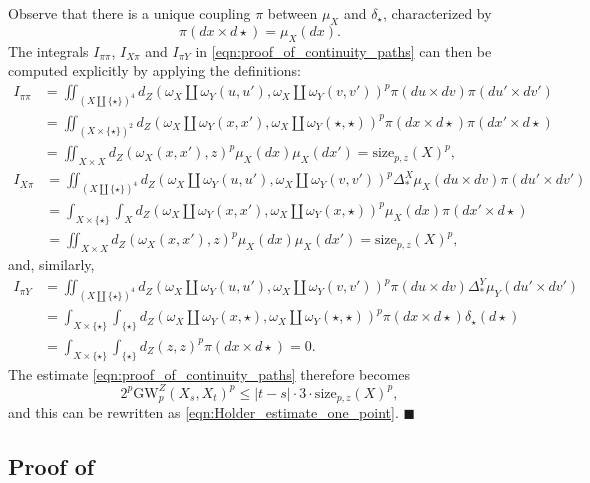\documentclass[twoside,11pt]{article}
\theoremstyle{definition}
\newcommand{\dgwz}{\mathrm{GW}_p^Z}
\begin{document}
    Observe that there is a unique coupling $\pi$ between $\mu_X$ and $\delta_\star$, characterized by
    \[
    \pi(dx \times d\star) = \mu_X(dx).
    \]
    The integrals $I_{\pi \pi}$, $I_{X\pi}$ and $I_{\pi Y}$ in \eqref{eqn:proof_of_continuity_paths} can then be computed explicitly by applying the definitions:
    \begin{align}
        I_{\pi \pi} &= \iint_{(X \amalg \{\star\})^4} d_Z(\omega_X \amalg \omega_Y(u,u'), \omega_X \amalg \omega_Y(v,v'))^p \pi(du \times dv) \pi(du' \times dv') \\
        &= \iint_{(X \times \{\star\})^2} d_Z(\omega_X \amalg \omega_Y(x,x'), \omega_X \amalg \omega_Y(\star,\star))^p \pi(dx \times d\star) \pi(dx' \times d\star) \\
        &= \iint_{X \times X} d_Z(\omega_X(x,x'),z)^p \mu_X(dx)\mu_X(dx') = \mathrm{size}_{p,z}(X)^p,
    \end{align}
    \begin{align}
        I_{X\pi} &= \iint_{(X \amalg \{\star\})^4} d_Z(\omega_X \amalg \omega_Y(u,u'), \omega_X \amalg \omega_Y(v,v'))^p \Delta^X_\ast \mu_X(du \times dv) \pi(du' \times dv') \\
        &= \int_{X \times \{\star\}} \int_X d_Z(\omega_X \amalg \omega_Y(x,x'), \omega_X \amalg \omega_Y(x,\star))^p \mu_X(dx) \pi(dx' \times d\star) \\
        &= \iint_{X \times X} d_Z(\omega_X(x,x'), z)^p \mu_X(dx) \mu_X(dx') = \mathrm{size}_{p,z}(X)^p,
    \end{align}
    and, similarly,
    \begin{align}
       I_{\pi Y} &=  \iint_{(X \amalg \{\star\})^4} d_Z(\omega_X \amalg \omega_Y(u,u'), \omega_X \amalg \omega_Y(v,v'))^p \pi(du \times dv) \Delta^Y_\ast \mu_Y(du' \times dv') \\
       &= \int_{X \times \{\star\}} \int_{\{\star\}} d_Z(\omega_X \amalg \omega_Y(x,\star), \omega_X \amalg \omega_Y(\star,\star))^p \pi(dx \times d\star) \delta_\star(d\star) \\
       &= \int_{X \times \{\star\}} \int_{\{\star\}} d_Z(z,z)^p \pi(dx \times d\star) = 0.
    \end{align}
    The estimate \eqref{eqn:proof_of_continuity_paths} therefore becomes
    \[
    2^p \dgwz(X_s,X_t)^p \leq |t-s| \cdot 3 \cdot \mathrm{size}_{p,z}(X)^p,
    \]
    and this can be rewritten as \eqref{eqn:Holder_estimate_one_point}.
    \hfill $\blacksquare$

\subsection{Proof of \texorpdfstring{}{Lemma \ref{lem:lemma28}}}\label{app:lemma28}
\end{document}

